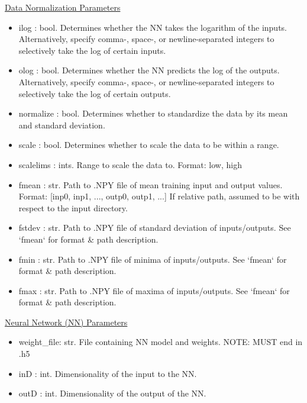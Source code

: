 \documentclass[letterpaper, 12pt]{article}
\begin{document}
\noindent \underline{Data Normalization Parameters}
\begin{itemize}
\item ilog        : bool. Determines whether the NN takes the logarithm of the 
                          inputs.
                          Alternatively, specify comma-, space-, or newline-separated 
                          integers to selectively take the log of certain inputs.
\item olog        : bool. Determines whether the NN predicts the log of the 
                          outputs.
                          Alternatively, specify comma-, space-, or newline-separated 
                          integers to selectively take the log of certain outputs.
\item normalize   : bool. Determines whether to standardize the data by its 
                          mean and standard deviation.
\item scale       : bool. Determines whether to scale the data to be within a 
                          range.
\item scalelims   : ints. Range to scale the data to.
                          Format: low, high
\item fmean       : str.  Path to .NPY file of mean training input and output 
                          values.
                          Format: [inp0, inp1, ..., outp0, outp1, ...]
                          If relative path, assumed to be with respect to the 
                          input directory.
\item fstdev      : str.  Path to .NPY file of standard deviation of 
                          inputs/outputs.
                          See `fmean` for format \& path description.
\item fmin        : str.  Path to .NPY file of minima of inputs/outputs.
                          See `fmean` for format \& path description.
\item fmax        : str.  Path to .NPY file of maxima of inputs/outputs.
                          See `fmean` for format \& path description.
\end{itemize}


\noindent \underline{Neural Network (NN) Parameters}
\begin{itemize}
\item weight\_file: str.  File containing NN model and weights.
                    NOTE: MUST end in .h5
\item inD  : int.  Dimensionality of the input  to the NN.
\item outD : int.  Dimensionality of the output of the NN.
\end{itemize}
\end{document}
